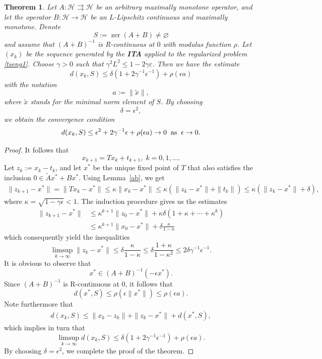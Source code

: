 \documentclass[12pt]{article}
\theoremstyle{plain}
\newtheorem{theorem}{Theorem}
\newcommand{\zer}{\operatorname{zer}}
\begin{document}
\begin{theorem}\label{thm:ita} Let $A:\mathcal{H}\rightrightarrows \mathcal{H}$ be an arbitrary maximally monotone operator, and let the operator $B:\mathcal{H}\to\mathcal{H}$ be an $L$-Lipschitz continuous and maximally monotone. Denote 
\[
S:=\zer (A+B)\neq\varnothing
\]
and assume that $(A+B)^{-1}$ is R-continuous at $0$ with modulus function $\rho$. Let $(x_k)$ be the sequence generated by the {\bf ITA} applied to the regularized problem \eqref{tseng1}. Choose $\gamma>0$ such that $\gamma^2 L^2\le 1-2\gamma\varepsilon $.
Then we have the estimate
\begin{equation}
d(x_k,S)
\leq
\delta(1+2\gamma^{-1}\epsilon^{-1})
+
\rho(\epsilon a)
\end{equation}
with the notation
\[
a:=\|\widetilde{x}\|,
\]
where $\widetilde{x}$ stands for the minimal norm element of $S$. 
By choosing
\[
\delta=\epsilon^2,
\]
we obtain the convergence condition
\begin{equation*}
d(x_k,S)
\leq
\epsilon^2+2\gamma^{-1}\epsilon+\rho(\epsilon a)\to 0 \;\; {\rm as}\; \;\epsilon\to 0.
\end{equation*}
\end{theorem}
\begin{proof}
It follows that
$$
x_{k+1}= Tx_k+t_{k+1},\;k=0,1,\ldots.
$$
Let $z_k:=x_{k}-t_k$, and let $x^*$ be the unique fixed point of $T$ that also satisfies the inclusion $0\in \tilde{A}x^*+Bx^*$. Using Lemma~\ref{ab}, we get
\begin{align*}
\|z_{k+1}-x^*\|
=\| Tx_k-x^*\|\le \kappa\|x_k-x^*\|
\leq
\kappa(\|z_k-x^*\|+\|t_k\|)\le \kappa(\|z_k-x^*\|+\delta),
\end{align*}
where $\kappa=\sqrt{1-\gamma\epsilon}<1$. The induction procedure gives us the estimates
\begin{align*}
\|z_{k+1}-x^*\|
&\leq
\kappa^{k+1}\|z_0-x^*\|
+
\kappa\delta(1+\kappa+\cdots+\kappa^k) \\
&\leq
\kappa^{k+1}\|x_0-x^*\|
+
\delta\frac{\kappa}{1-\kappa}
\end{align*}
which consequently yield the inequalities
\[
\limsup_{k\to\infty}\|z_k-x^*\|
\leq
\delta\frac{\kappa}{1-\kappa}\le\delta\frac{1+\kappa}{1-\kappa^2} \le 2\delta \gamma^{-1}\epsilon^{-1}.
\]
It is {obvious} to observe that
\[
x^*\in (A+B)^{-1}(-\epsilon x^*).
\]
Since $(A+B)^{-1}$ is R-continuous at $0$, it follows that
\[
d(x^*,S)
\leq
\rho(\epsilon\|x^*\|)\le\rho(\epsilon a).
\]
Note furthermore that
\begin{align*}
d(x_k,S)
\leq
\|x_k-z_k\|
+
\|z_k-x^*\|
+
d(x^*,S),
\end{align*}
which implies in turn that
$$
\limsup_{k\to\infty} d(x_k,S)\leq
\delta(1+
2\gamma^{-1}\epsilon^{-1})
+
\rho(\epsilon a).
$$
By choosing $\delta=\epsilon^{2}$, we complete the proof of the theorem.
\end{proof}
\end{document}
